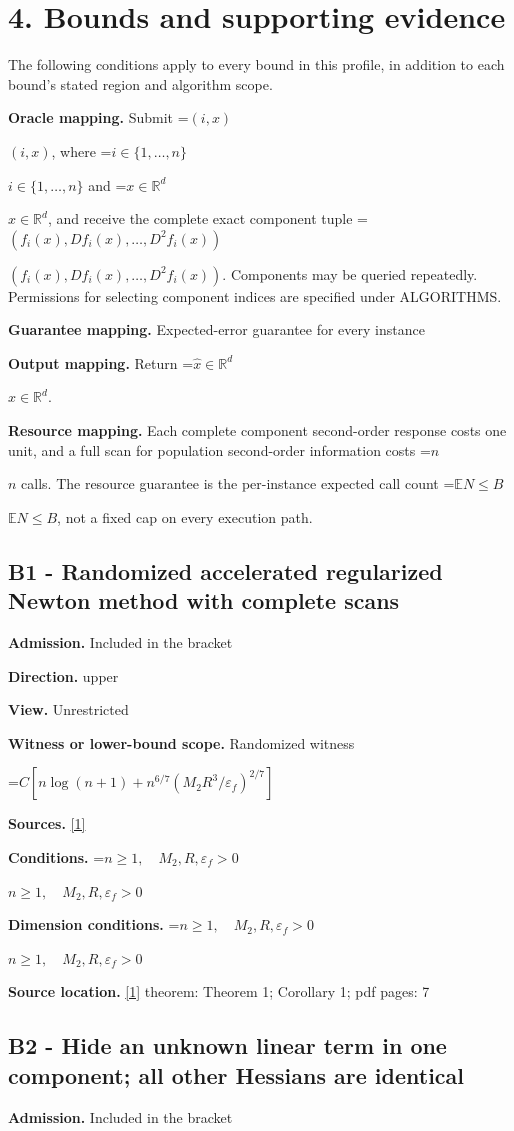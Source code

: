 \documentclass[10pt,a4paper]{article}
\newcommand{\AtlasMath}[1]{\par\begingroup\centering\setbox0=\hbox{$\displaystyle #1$}\ifdim\wd0>1.4\linewidth\typeout{ATLAS WIDE FORMULA: \the\wd0}\fi\ifdim\wd0>\linewidth\resizebox{\linewidth}{!}{\box0}\else\box0\fi\par\endgroup}
\newcommand{\AtlasInlineMath}[1]{\begingroup\setbox0=\hbox{$#1$}\ifdim\wd0>.4\linewidth\endgroup\AtlasMath{#1}\else\endgroup$#1$\fi}
\begin{document}
\section{4. Bounds and supporting evidence}
The following conditions apply to every bound in this profile, in addition to each bound's stated region and algorithm scope.

\textbf{Oracle mapping.} Submit \AtlasInlineMath{(i,x)}, where \AtlasInlineMath{i\in\{1,\ldots,n\}} and \AtlasInlineMath{x\in\mathbb{R}^d}, and receive the complete exact component tuple \AtlasInlineMath{(f_i(x),Df_i(x),\ldots,D^{2}f_i(x))}. Components may be queried repeatedly. Permissions for selecting component indices are specified under ALGORITHMS.

\textbf{Guarantee mapping.} Expected-error guarantee for every instance

\textbf{Output mapping.} Return \AtlasInlineMath{\widehat{x}\in \mathbb{R}^d}.

\textbf{Resource mapping.} Each complete component second-order response costs one unit, and a full scan for population second-order information costs \AtlasInlineMath{n} calls. The resource guarantee is the per-instance expected call count \AtlasInlineMath{\mathbb{E}N\le B}, not a fixed cap on every execution path.

\subsection{B1 - Randomized accelerated regularized Newton method with complete scans}
\textbf{Admission.} Included in the bracket

\textbf{Direction.} upper

\textbf{View.} Unrestricted

\textbf{Witness or lower-bound scope.} Randomized witness

\AtlasMath{C[n\log(n+1)+n^{6/7}(M_2R^3/\varepsilon_f)^{2/7}]}
\textbf{Sources.} \href{https://arxiv.org/pdf/2610.10495v1}{[1]}

\textbf{Conditions.} \AtlasInlineMath{n\ge1,\quad M_2,R,\varepsilon_f>0}

\textbf{Dimension conditions.} \AtlasInlineMath{n\ge1,\quad M_2,R,\varepsilon_f>0}

\textbf{Source location.} \href{https://arxiv.org/pdf/2610.10495v1}{[1]} theorem: Theorem 1; Corollary 1; pdf pages: 7

\subsection{B2 - Hide an unknown linear term in one component; all other Hessians are identical}
\textbf{Admission.} Included in the bracket
\end{document}
